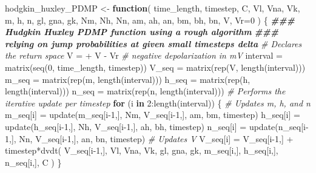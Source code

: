 \documentclass[
]{article}
\newenvironment{Shaded}{\begin{snugshade}}{\end{snugshade}}
\newcommand{\AttributeTok}[1]{\textcolor[rgb]{0.77,0.63,0.00}{#1}}
\newcommand{\CommentTok}[1]{\textcolor[rgb]{0.56,0.35,0.01}{\textit{#1}}}
\newcommand{\ControlFlowTok}[1]{\textcolor[rgb]{0.13,0.29,0.53}{\textbf{#1}}}
\newcommand{\DecValTok}[1]{\textcolor[rgb]{0.00,0.00,0.81}{#1}}
\newcommand{\DocumentationTok}[1]{\textcolor[rgb]{0.56,0.35,0.01}{\textbf{\textit{#1}}}}
\newcommand{\FunctionTok}[1]{\textcolor[rgb]{0.00,0.00,0.00}{#1}}
\newcommand{\NormalTok}[1]{#1}
\newcommand{\OtherTok}[1]{\textcolor[rgb]{0.56,0.35,0.01}{#1}}
\newcommand{\SpecialCharTok}[1]{\textcolor[rgb]{0.00,0.00,0.00}{#1}}
\begin{document}
\begin{Shaded}
\begin{Highlighting}[]
\NormalTok{hodgkin\_huxley\_PDMP }\OtherTok{\textless{}{-}} \ControlFlowTok{function}\NormalTok{(}
\NormalTok{  time\_length, timestep,}
\NormalTok{  C, }
\NormalTok{  Vl, Vna, Vk, }
\NormalTok{  m, h, n,}
\NormalTok{  gl, gna, gk,}
\NormalTok{  Nm, Nh, Nn,}
\NormalTok{  am, ah, an, bm, bh, bn,}
\NormalTok{  V, }\AttributeTok{Vr=}\DecValTok{0}
\NormalTok{) \{}
  \DocumentationTok{\#\#\# Hudgkin Huxley PDMP function using a rough algorithm}
  \DocumentationTok{\#\#\# relying on jump probabilities at given small timesteps delta}
  \CommentTok{\# Declares the return space}
\NormalTok{  V }\OtherTok{=} \SpecialCharTok{+}\NormalTok{ V }\SpecialCharTok{{-}}\NormalTok{ Vr }\CommentTok{\# negative depolarization in mV}
\NormalTok{  interval }\OtherTok{=} \FunctionTok{matrix}\NormalTok{(}\FunctionTok{seq}\NormalTok{(}\DecValTok{0}\NormalTok{, time\_length, timestep))}
\NormalTok{  V\_seq    }\OtherTok{=} \FunctionTok{matrix}\NormalTok{(}\FunctionTok{rep}\NormalTok{(V, }\FunctionTok{length}\NormalTok{(interval)))}
\NormalTok{  m\_seq    }\OtherTok{=} \FunctionTok{matrix}\NormalTok{(}\FunctionTok{rep}\NormalTok{(m, }\FunctionTok{length}\NormalTok{(interval)))}
\NormalTok{  h\_seq    }\OtherTok{=} \FunctionTok{matrix}\NormalTok{(}\FunctionTok{rep}\NormalTok{(h, }\FunctionTok{length}\NormalTok{(interval)))}
\NormalTok{  n\_seq    }\OtherTok{=} \FunctionTok{matrix}\NormalTok{(}\FunctionTok{rep}\NormalTok{(n, }\FunctionTok{length}\NormalTok{(interval)))}
  \CommentTok{\# Performs the iterative update per timestep}
  \ControlFlowTok{for}\NormalTok{ (i }\ControlFlowTok{in} \DecValTok{2}\SpecialCharTok{:}\FunctionTok{length}\NormalTok{(interval)) \{}
    \CommentTok{\# Updates m, h, and n}
\NormalTok{    m\_seq[i] }\OtherTok{=} \FunctionTok{update}\NormalTok{(m\_seq[i}\DecValTok{{-}1}\NormalTok{,], Nm, V\_seq[i}\DecValTok{{-}1}\NormalTok{,], am, bm, timestep)}
\NormalTok{    h\_seq[i] }\OtherTok{=} \FunctionTok{update}\NormalTok{(h\_seq[i}\DecValTok{{-}1}\NormalTok{,], Nh, V\_seq[i}\DecValTok{{-}1}\NormalTok{,], ah, bh, timestep)}
\NormalTok{    n\_seq[i] }\OtherTok{=} \FunctionTok{update}\NormalTok{(n\_seq[i}\DecValTok{{-}1}\NormalTok{,], Nn, V\_seq[i}\DecValTok{{-}1}\NormalTok{,], an, bn, timestep)}
    \CommentTok{\# Updates V}
\NormalTok{    V\_seq[i] }\OtherTok{=}\NormalTok{ V\_seq[i}\DecValTok{{-}1}\NormalTok{,] }\SpecialCharTok{+}\NormalTok{ timestep}\SpecialCharTok{*}\FunctionTok{dvdt}\NormalTok{(}
\NormalTok{      V\_seq[i}\DecValTok{{-}1}\NormalTok{,], Vl, Vna, Vk, gl, gna, gk,}
\NormalTok{      m\_seq[i,], h\_seq[i,], n\_seq[i,], C}
\NormalTok{    )}
\NormalTok{  \}}

\end{Highlighting}
\end{Shaded}
\end{document}
